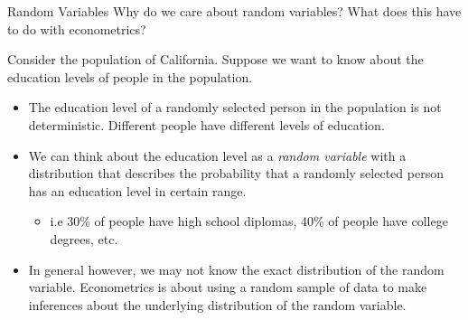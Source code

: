 \documentclass[notheorems,9pt]{beamer}
\begin{document}
\begin{frame}{Random Variables} 
	\label{frame:rv-statistics}
	 Why do we care about random variables? What does this have to do with econometrics?	

	Consider the population of California. Suppose we want to know about the education levels of people in the population.
	\begin{itemize}
		\item<1-> The education level of a randomly selected person in the population is not deterministic. Different people have different levels of education. 
		\item<2-> We can think about the education level as a \emph{random variable} with a distribution that describes the probability that a randomly selected person has an education level in certain range.
		\begin{itemize}
			\item i.e 30\% of people have high school diplomas, 40\% of people have college degrees, etc. 
		\end{itemize}
		\item<3-> In general however, we may not know the exact distribution of the random variable. Econometrics is about using a random sample of data to make inferences about the underlying distribution of the random variable.
	\end{itemize}
\end{frame}
\end{document}
